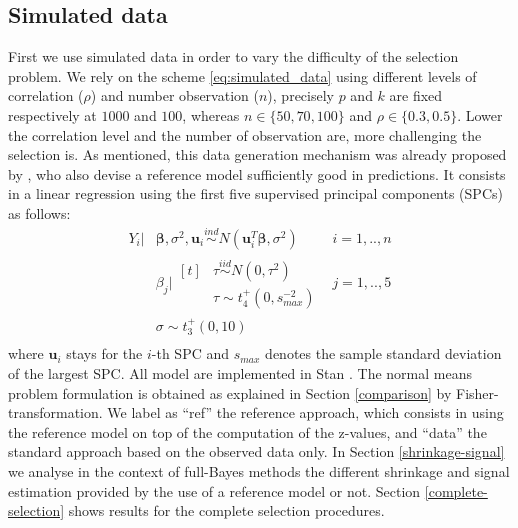\documentclass[american,]{article}
\theoremstyle{definition}
\begin{document}
\hypertarget{simulated-data}{%
\subsection{Simulated data}\label{simulated-data}}

First we use simulated data in order to vary the difficulty of the selection problem. We rely on the scheme \eqref{eq:simulated_data} using different levels of correlation ($\rho$) and number observation ($n$), precisely $p$ and $k$ are fixed respectively at $1000$ and $100$, whereas $n\in\{50,70,100\}$ and $\rho\in\{0.3,0.5\}$. Lower the correlation level and the number of observation are, more challenging the selection is. As mentioned, this data generation mechanism was already proposed by \cite{paper:projpred}, who also devise a reference model sufficiently good in predictions. It consists in a linear regression using the first five supervised principal components (SPCs) \citep{paper:original_spc, paper:spc} as follows:
\
\begin{equation}
\label{eq:ref_mod}
\begin{aligned}
    Y_{i}|&\boldsymbol{\beta},\sigma^{2},\boldsymbol{u}_{i} \overset{ind}{\sim} N(\boldsymbol{u}_{i}^{T}\boldsymbol{\beta},\sigma^{2}) \quad &i=1,..,n \\
    &\beta_{j}|\!\begin{aligned}[t] &\tau \overset{iid}{\sim} N(0,\tau^{2})\\
    &\tau \sim t_{4}^{+}(0,s_{max}^{-2}) 
    \end{aligned} &j=1,..,5 \\ 
    &\sigma \sim t_{3}^{+}(0,10) \\
\end{aligned}
\end{equation}
where $\boldsymbol{u}_{i}$ stays for the $i$-th SPC and $s_{max}$ denotes the sample standard deviation of the largest SPC. All model are implemented in Stan \citep{paper:stan}. The normal means problem formulation is obtained as explained in Section \ref{comparison} by Fisher-transformation. We label as ``ref'' the reference approach, which consists in using the reference model on top of the computation of the z-values, and ``data'' the standard approach based on the observed data only. In Section \ref{shrinkage-signal} we analyse in the context of full-Bayes methods the different shrinkage and signal estimation provided by the use of a reference model or not. Section \ref{complete-selection} shows results for the complete selection procedures.
\end{document}
